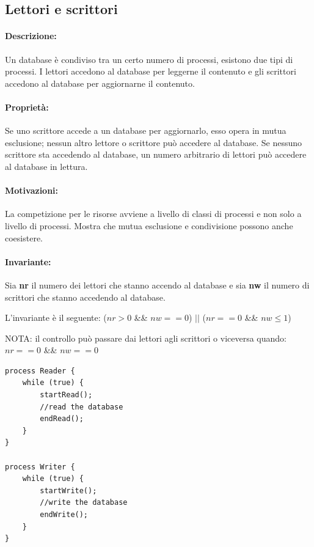 \subsection{Lettori e scrittori}

\paragraph{Descrizione:} Un database è condiviso tra un certo numero di processi, esistono due tipi di processi.
I lettori accedono al database per leggerne il contenuto
e gli scrittori accedono al database per aggiornarne il contenuto.

\paragraph{Proprietà:} Se uno scrittore accede a un database per aggiornarlo, esso opera in mutua esclusione; nessun altro lettore o scrittore può accedere al database.
Se nessuno scrittore sta accedendo al database, un numero arbitrario di lettori può accedere al database in lettura.

\paragraph{Motivazioni:} La competizione per le risorse avviene a livello di classi di processi e non solo a livello di processi. Mostra che mutua esclusione e condivisione possono anche coesistere.

\paragraph{Invariante:} Sia \textbf{nr} il numero dei lettori che stanno accendo al database e sia \textbf{nw} il numero di scrittori che stanno accedendo al database.

L'invariante è il seguente: ($nr > 0$ \&\& $nw == 0$) $||$ ($nr == 0$ \&\& $nw \le 1$)

NOTA: il controllo può passare dai lettori agli scrittori o viceversa quando: $nr == 0$ \&\& $nw == 0$

\begin{lstlisting}
process Reader {
    while (true) {
        startRead();
        //read the database
        endRead();
    }
}

process Writer {
    while (true) {
        startWrite();
        //write the database
        endWrite();
    }
}
\end{lstlisting}

